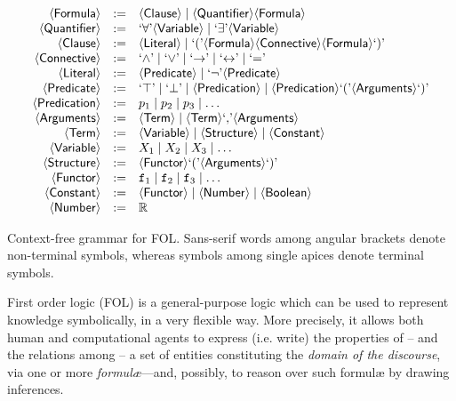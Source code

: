 \documentclass[12pt,a4paper,openright,twoside]{book}
\begin{document}
\begin{table}
    $$\begin{array}{rcl}
        \meta{Formula} & := & \meta{Clause} \mid \meta{Quantifier} \meta{Formula}
        \\
        \meta{Quantifier} & := & \terminal{\forall} \meta{Variable} \mid \terminal{\exists} \meta{Variable}
        \\
        \meta{Clause} & := & \meta{Literal} \mid \terminal{(} \meta{Formula} \meta{Connective} \meta{Formula} \terminal{)}
        \\
        \meta{Connective} & := & \terminal{\wedge} \mid \terminal{\vee} \mid \terminal{\rightarrow} \mid \terminal{\leftrightarrow} \mid \terminal{=}
        \\
        \meta{Literal}  & := & \meta{Predicate} \mid \terminal{\lnot} \meta{Predicate}
        \\
        \meta{Predicate} & := & \terminal{\top} \mid \terminal{\bot} \mid \meta{Predication} \mid \meta{Predication} \terminal{(} \meta{Arguments} \terminal{)}
        \\
        \meta{Predication} & := & p_1 \mid p_2 \mid p_3 \mid \ldots
        \\
        \meta{Arguments} & := & \meta{Term} \mid \meta{Term} \terminal{,} \meta{Arguments}
        \\
        \meta{Term} & := & \meta{Variable} \mid \meta{Structure} \mid \meta{Constant}
        \\
        \meta{Variable} & := & X_1 \mid X_2 \mid X_3 \mid \ldots
        \\
        \meta{Structure} & := & \meta{Functor} \terminal{(} \meta{Arguments} \terminal{)}
        \\
        \meta{Functor} & := & \functor{f}_1 \mid \functor{f}_2 \mid \functor{f}_3 \mid \ldots
        \\
        \meta{Constant} & := & \meta{Functor} \mid \meta{Number}\mid \meta{Boolean}
        \\
        \meta{Number} & := & \mathbb{R}
    \end{array}$$
    \caption[Context-free grammar for FOL]{Context-free grammar for FOL. Sans-serif words among angular brackets denote non-terminal symbols, whereas symbols among single apices denote terminal symbols.}
    \label{tab:fol-grammar}
\end{table}

First order logic (FOL) \cite{Smullyan1968} is a general-purpose logic which can be used to represent knowledge symbolically, in a very flexible way.
%
More precisely, it allows both human and computational agents to express (i.e. write) the properties of -- and the relations among -- a set of entities constituting the \emph{domain of the discourse}, via one or more \emph{formul\ae}---and, possibly, to reason over such formul\ae{} by drawing inferences.
\end{document}
